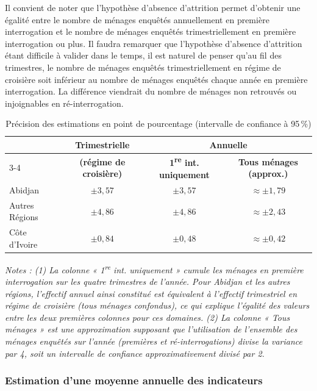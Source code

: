 \documentclass[12pt, a4paper]{article}
\begin{document}
Il convient de noter que l'hypothèse d'absence d'attrition permet d'obtenir une égalité entre le nombre de ménages enquêtés annuellement en première interrogation et le nombre de ménages enquêtés trimestriellement en première interrogation ou plus. Il faudra remarquer que l'hypothèse d'absence d'attrition étant difficile à valider dans le temps, il est naturel de penser qu'au fil des trimestres, le nombre de ménages enquêtés trimestriellement en régime de croisière soit inférieur au nombre de ménages enquêtés chaque année en première interrogation. La différence viendrait du nombre de ménages non retrouvés ou injoignables en ré-interrogation.

\begin{table}[H]
\centering
\caption{Précision des estimations en point de pourcentage (intervalle de confiance à 95\,\%)}
\label{tab:precision}
\footnotesize
\begin{tabular}{lccc}
\toprule
 & \textbf{Trimestrielle} & \multicolumn{2}{c}{\textbf{Annuelle}} \\
\cmidrule(lr){3-4}
 & \textbf{(régime de croisière)} & \textbf{1\textsuperscript{re} int. uniquement} & \textbf{Tous ménages (approx.)} \\
\midrule
Abidjan        & $\pm3{,}57$ & $\pm3{,}57$  & $\approx\pm1{,}79$ \\
Autres Régions & $\pm4{,}86$ & $\pm4{,}86$  & $\approx\pm2{,}43$ \\
Côte d'Ivoire  & $\pm0{,}84$ & $\pm0{,}48$  & $\approx\pm0{,}42$ \\
\bottomrule
\end{tabular}
\end{table}

\noindent\textit{Notes : (1) La colonne « 1\textsuperscript{re} int. uniquement » cumule les ménages en première interrogation sur les quatre trimestres de l'année. Pour Abidjan et les autres régions, l'effectif annuel ainsi constitué est équivalent à l'effectif trimestriel en régime de croisière (tous ménages confondus), ce qui explique l'égalité des valeurs entre les deux premières colonnes pour ces domaines. (2) La colonne « Tous ménages » est une approximation supposant que l'utilisation de l'ensemble des ménages enquêtés sur l'année (premières et ré-interrogations) divise la variance par 4, soit un intervalle de confiance approximativement divisé par 2.}

\subsubsection{Estimation d'une moyenne annuelle des indicateurs}
\end{document}
